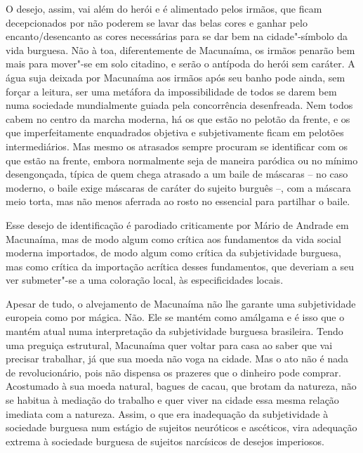 {O desejo, assim, vai além do herói e é alimentado pelos irmãos, que
ficam decepcionados por não poderem se lavar das belas cores e ganhar
pelo encanto/desencanto as cores necessárias para se dar bem na
cidade"-símbolo da vida burguesa. Não à toa, diferentemente de Macunaíma,
os irmãos penarão bem mais para mover"-se em solo citadino, e serão o
antípoda do herói sem caráter. A água suja deixada por Macunaíma aos
irmãos após seu banho pode ainda, sem forçar a leitura, ser uma metáfora
da impossibilidade de todos se darem bem numa sociedade mundialmente
guiada pela concorrência desenfreada. Nem todos cabem no centro da
marcha moderna, há os que estão no pelotão da frente, e os que
imperfeitamente enquadrados objetiva e subjetivamente ficam em pelotões
intermediários. Mas mesmo os atrasados sempre procuram se identificar
com os que estão na frente, embora normalmente seja de maneira paródica
ou no mínimo desengonçada, típica de quem chega atrasado a um baile de
máscaras -- no caso moderno, o baile exige máscaras de caráter do
sujeito burguês --, com a máscara meio torta, mas não menos aferrada ao
rosto no essencial para partilhar o baile.

Esse desejo de identificação é parodiado criticamente por Mário de
Andrade em Macunaíma, mas de modo algum como crítica aos fundamentos da
vida social moderna importados, de modo algum como crítica da
subjetividade burguesa, mas como crítica da importação acrítica desses
fundamentos, que deveriam a seu ver submeter"-se a uma coloração local,
às especificidades locais.

Apesar de tudo, o alvejamento de Macunaíma não lhe garante uma
subjetividade europeia como por mágica. Não. Ele se mantém como amálgama
e é isso que o mantém atual numa interpretação da subjetividade burguesa
brasileira. Tendo uma preguiça estrutural, Macunaíma quer voltar para
casa ao saber que vai precisar trabalhar, já que sua moeda não voga na
cidade. Mas o ato não é nada de revolucionário, pois não dispensa os
prazeres que o dinheiro pode comprar. Acostumado à sua moeda natural,
bagues de cacau, que brotam da natureza, não se habitua à mediação do
trabalho e quer viver na cidade essa mesma relação imediata com a
natureza. Assim, o que era inadequação da subjetividade à sociedade
burguesa num estágio de sujeitos neuróticos e ascéticos, vira adequação
extrema à sociedade burguesa de sujeitos narcísicos de desejos
imperiosos.

}
